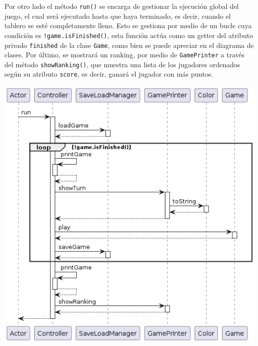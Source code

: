 \documentclass[../DocumentoOficial.tex]{subfiles}
\begin{document}
\begin{sprint}[1]
Por otro lado el método \texttt{run()} se encarga de gestionar la ejecución global del juego, el cual será ejecutado hasta que haya terminado, es decir, cuando el tablero se esté completamente lleno. Esto se gestiona por medio de un bucle cuya condición es \texttt{!game.isFinished()}, esta función actúa como un getter del atributo privado \texttt{finished} de la clase \texttt{Game}, como bien se puede apreciar en el diagrama de clases. Por último, se mostrará un ranking, por medio de \texttt{GamePrinter} a través del método \texttt{showRanking()}, que muestra una lista de los jugadores ordenados según su atributo \texttt{score}, es decir, ganará el jugador con más puntos.
\begin{center}
\includegraphics[scale=0.55]{controller-runS1.png}
\end{center}


\end{sprint}
\end{document}
